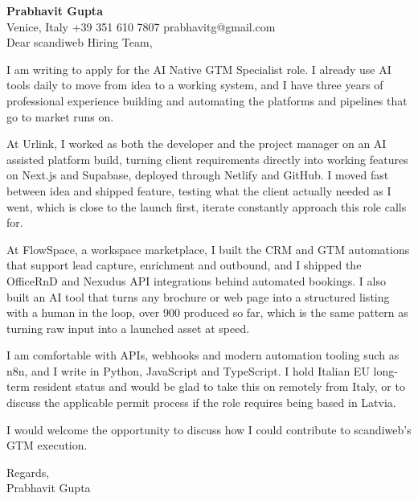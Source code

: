 \documentclass[a4paper,10.5pt]{article}
\begin{document}
\textbf{Prabhavit Gupta}\\
Venice, Italy \textbar{} +39 351 610 7807 \textbar{} prabhavitg@gmail.com\\[10pt]
Dear scandiweb Hiring Team,

I am writing to apply for the AI Native GTM Specialist role. I already use AI tools daily to move from idea to a working system, and I have three years of professional experience building and automating the platforms and pipelines that go to market runs on.

At Urlink, I worked as both the developer and the project manager on an AI assisted platform build, turning client requirements directly into working features on Next.js and Supabase, deployed through Netlify and GitHub. I moved fast between idea and shipped feature, testing what the client actually needed as I went, which is close to the launch first, iterate constantly approach this role calls for.

At FlowSpace, a workspace marketplace, I built the CRM and GTM automations that support lead capture, enrichment and outbound, and I shipped the OfficeRnD and Nexudus API integrations behind automated bookings. I also built an AI tool that turns any brochure or web page into a structured listing with a human in the loop, over 900 produced so far, which is the same pattern as turning raw input into a launched asset at speed.

I am comfortable with APIs, webhooks and modern automation tooling such as n8n, and I write in Python, JavaScript and TypeScript. I hold Italian EU long-term resident status and would be glad to take this on remotely from Italy, or to discuss the applicable permit process if the role requires being based in Latvia.

I would welcome the opportunity to discuss how I could contribute to scandiweb's GTM execution.

Regards,\\
Prabhavit Gupta
\end{document}
